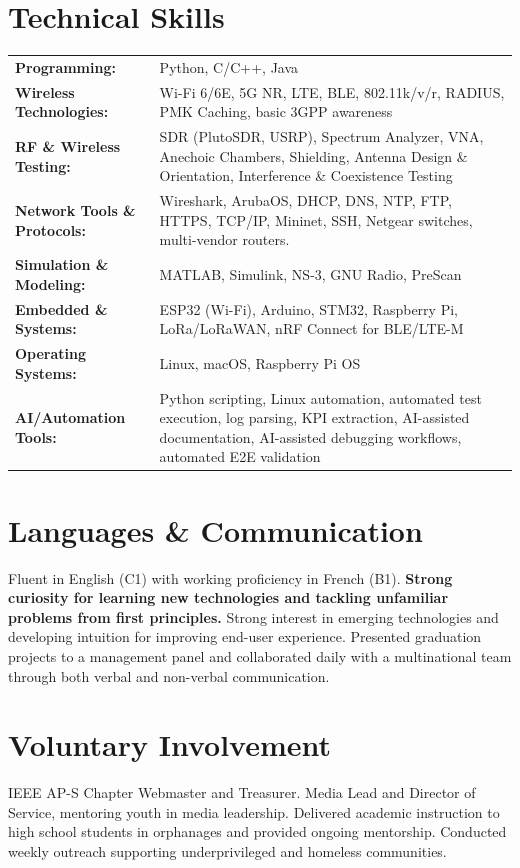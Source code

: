 \documentclass[letterpaper,11pt]{article}
\begin{document}
\section{Technical Skills}
\small{
\begin{tabularx}{\textwidth}{@{}l X@{}}
\textbf{Programming:} & Python, C/C++, Java \\

\textbf{Wireless Technologies:} & Wi-Fi 6/6E, 5G NR, LTE, BLE, 802.11k/v/r, RADIUS, PMK Caching, basic 3GPP awareness \\

\textbf{RF \& Wireless Testing:} & SDR (PlutoSDR, USRP), Spectrum Analyzer, VNA, Anechoic Chambers, Shielding, Antenna Design \& Orientation, Interference \& Coexistence Testing \\

\textbf{Network Tools \& Protocols:} & Wireshark, ArubaOS, DHCP, DNS, NTP, FTP, HTTPS, TCP/IP, Mininet, SSH, Netgear switches, multi-vendor routers. \\

\textbf{Simulation \& Modeling:} & MATLAB, Simulink, NS-3, GNU Radio, PreScan \\

\textbf{Embedded \& Systems:} & ESP32 (Wi-Fi), Arduino, STM32, Raspberry Pi, LoRa/LoRaWAN, nRF Connect for BLE/LTE-M \\

\textbf{Operating Systems:} & Linux, macOS, Raspberry Pi OS \\

\textbf{AI/Automation Tools:} & Python scripting, Linux automation, automated test execution, log parsing, KPI extraction, AI-assisted documentation, AI-assisted debugging workflows, automated E2E validation \\
\end{tabularx}
}

\section{Languages \& Communication}
Fluent in English (C1) with working proficiency in French (B1). \textbf{Strong curiosity for learning new technologies and tackling unfamiliar problems from first principles.} Strong interest in emerging technologies and developing intuition for improving end-user experience. Presented graduation projects to a management panel and collaborated daily with a multinational team through both verbal and non-verbal communication.



\section{Voluntary Involvement}
IEEE AP-S Chapter Webmaster and Treasurer. Media Lead and Director of Service, mentoring youth in media leadership. Delivered academic instruction to high school students in orphanages and provided ongoing mentorship. Conducted weekly outreach supporting underprivileged and homeless communities.
\end{document}
